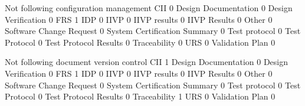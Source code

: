 \documentclass{article}
\begin{document}
\begin{Schunk}
\begin{Soutput}
                               Not following configuration management
  CII                                                               0
  Design Documentation                                              0
  Design Verification                                               0
  FRS                                                               1
  IDP                                                               0
  IIVP                                                              0
  IIVP results                                                      0
  IIVP Results                                                      0
  Other                                                             0
  Software Change Request                                           0
  System Certification Summary                                      0
  Test protocol                                                     0
  Test Protocol                                                     0
  Test Protocol Results                                             0
  Traceability                                                      0
  URS                                                               0
  Validation Plan                                                   0
                              
                               Not following document version control
  CII                                                               1
  Design Documentation                                              0
  Design Verification                                               0
  FRS                                                               1
  IDP                                                               0
  IIVP                                                              0
  IIVP results                                                      0
  IIVP Results                                                      0
  Other                                                             0
  Software Change Request                                           0
  System Certification Summary                                      0
  Test protocol                                                     0
  Test Protocol                                                     0
  Test Protocol Results                                             0
  Traceability                                                      1
  URS                                                               0
  Validation Plan                                                   0
                              

\end{Soutput}
\end{Schunk}
\end{document}
